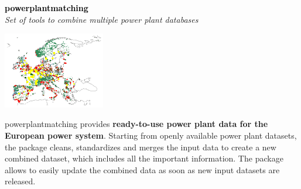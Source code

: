 \documentclass[a0,portrait]{a0poster}
\begin{document}
\begin{multicols}{3}
\noindent \textcolor{black}{\Large \textbf{powerplantmatching}}
\\
\textit{Set of tools to combine multiple power plant databases}
\vspace{0.5em}
\begin{center}
  \includegraphics[width=12em]{powerplantmatching.png}
\end{center}
\vspace{0.5em}
powerplantmatching provides \textbf{ready-to-use power plant data for the European power system}. 
Starting from openly available power plant datasets, the package cleans, standardizes 
and merges the input data to create a new combined dataset, which includes all the 
important information. The package allows to easily update the combined data as soon 
as new input datasets are released.


\singlespacing
\small
\nocite{*} %


\end{multicols}
\end{document}
